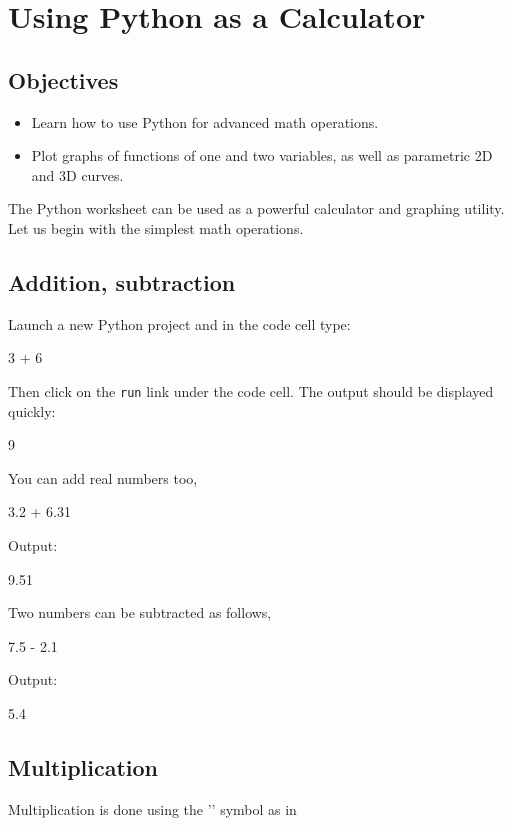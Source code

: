 
\section{Using Python as a Calculator} \label{sec:calc}

\subsection{Objectives}

\begin{itemize}
\item Learn how to use Python for advanced math operations.
\item Plot graphs of functions of one and two variables, as well as parametric 2D and 3D curves.
\end{itemize}
The Python worksheet can be used as a powerful calculator and graphing utility. 
Let us begin with the simplest math operations.

\subsection{Addition, subtraction}

Launch a new Python project and in the code cell type:

\begin{bluecode}
3 + 6
\end{bluecode}
Then click on the {\tt run} link under the code cell. The output should be displayed quickly:

\begin{bluecode}
9
\end{bluecode}
You can add real numbers too,
\begin{bluecode}
3.2 + 6.31
\end{bluecode}
Output:

\begin{bluecode}
9.51
\end{bluecode}
Two numbers can be subtracted as follows,

\begin{bluecode}
7.5 - 2.1
\end{bluecode}
Output:

\begin{bluecode}
5.4
\end{bluecode}

\subsection{Multiplication}
Multiplication is done using the '{\tt *}' symbol as in

